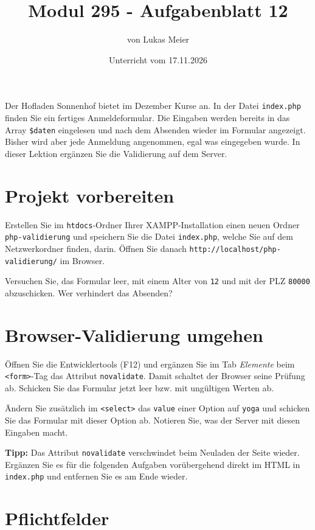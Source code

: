 \documentclass[a4paper,12pt]{article}
\title{Modul 295 - Aufgabenblatt 12}
\author{von Lukas Meier}
\date{Unterricht vom 17.11.2026}
\begin{document}
\maketitle

Der Hofladen Sonnenhof bietet im Dezember Kurse an. In der Datei \texttt{index.php} finden Sie ein fertiges Anmeldeformular. Die Eingaben werden bereits in das Array \texttt{\$daten} eingelesen und nach dem Absenden wieder im Formular angezeigt. Bisher wird aber jede Anmeldung angenommen, egal was eingegeben wurde. In dieser Lektion ergänzen Sie die Validierung auf dem Server.

\section{Projekt vorbereiten}

Erstellen Sie im \texttt{htdocs}-Ordner Ihrer XAMPP-Installation einen neuen Ordner \texttt{php-validierung} und speichern Sie die Datei \texttt{index.php}, welche Sie auf dem Netzwerkordner finden, darin. Öffnen Sie danach \texttt{http://localhost/php-validierung/} im Browser.

Versuchen Sie, das Formular leer, mit einem Alter von \texttt{12} und mit der PLZ \texttt{80000} abzuschicken. Wer verhindert das Absenden?

\section{Browser-Validierung umgehen}

Öffnen Sie die Entwicklertools (F12) und ergänzen Sie im Tab \emph{Elemente} beim \texttt{<form>}-Tag das Attribut \texttt{novalidate}. Damit schaltet der Browser seine Prüfung ab. Schicken Sie das Formular jetzt leer bzw. mit ungültigen Werten ab.

Ändern Sie zusätzlich im \texttt{<select>} das \texttt{value} einer Option auf \texttt{yoga} und schicken Sie das Formular mit dieser Option ab. Notieren Sie, was der Server mit diesen Eingaben macht.

\textbf{Tipp:} Das Attribut \texttt{novalidate} verschwindet beim Neuladen der Seite wieder. Ergänzen Sie es für die folgenden Aufgaben vorübergehend direkt im HTML in \texttt{index.php} und entfernen Sie es am Ende wieder.

\section{Pflichtfelder}
\end{document}
